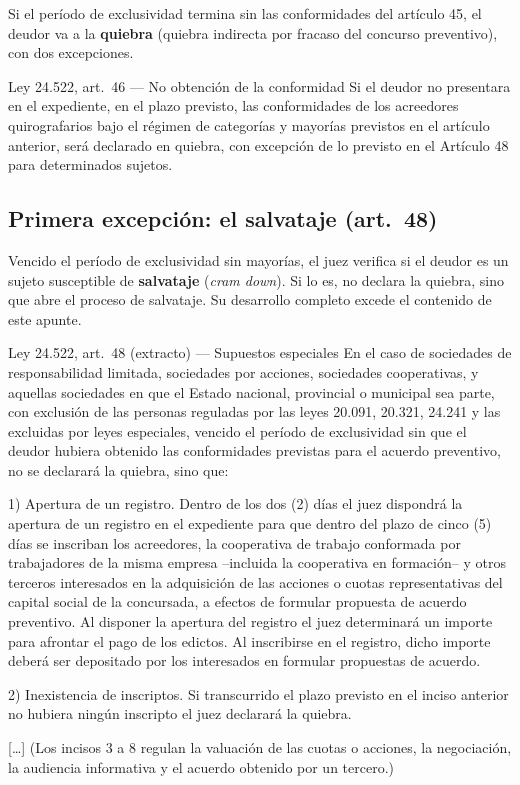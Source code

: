 \documentclass[12pt,oneside]{book}
\begin{document}
Si el período de exclusividad termina sin las conformidades del artículo 45, el deudor va a la \textbf{quiebra} (quiebra indirecta por fracaso del concurso preventivo), con dos excepciones.

\begin{norma}{Ley 24.522, art.\ 46 --- No obtención de la conformidad}
Si el deudor no presentara en el expediente, en el plazo previsto, las conformidades de los acreedores quirografarios bajo el régimen de categorías y mayorías previstos en el artículo anterior, será declarado en quiebra, con excepción de lo previsto en el Artículo 48 para determinados sujetos.
\end{norma}

\subsection{Primera excepción: el salvataje (art.\ 48)}

Vencido el período de exclusividad sin mayorías, el juez verifica si el deudor es un sujeto susceptible de \textbf{salvataje} (\emph{cram down}). Si lo es, no declara la quiebra, sino que abre el proceso de salvataje. Su desarrollo completo excede el contenido de este apunte.

\begin{norma}{Ley 24.522, art.\ 48 (extracto) --- Supuestos especiales}
En el caso de sociedades de responsabilidad limitada, sociedades por acciones, sociedades cooperativas, y aquellas sociedades en que el Estado nacional, provincial o municipal sea parte, con exclusión de las personas reguladas por las leyes 20.091, 20.321, 24.241 y las excluidas por leyes especiales, vencido el período de exclusividad sin que el deudor hubiera obtenido las conformidades previstas para el acuerdo preventivo, no se declarará la quiebra, sino que:

1) Apertura de un registro. Dentro de los dos (2) días el juez dispondrá la apertura de un registro en el expediente para que dentro del plazo de cinco (5) días se inscriban los acreedores, la cooperativa de trabajo conformada por trabajadores de la misma empresa --incluida la cooperativa en formación-- y otros terceros interesados en la adquisición de las acciones o cuotas representativas del capital social de la concursada, a efectos de formular propuesta de acuerdo preventivo. Al disponer la apertura del registro el juez determinará un importe para afrontar el pago de los edictos. Al inscribirse en el registro, dicho importe deberá ser depositado por los interesados en formular propuestas de acuerdo.

2) Inexistencia de inscriptos. Si transcurrido el plazo previsto en el inciso anterior no hubiera ningún inscripto el juez declarará la quiebra.

[\ldots] (Los incisos 3 a 8 regulan la valuación de las cuotas o acciones, la negociación, la audiencia informativa y el acuerdo obtenido por un tercero.)
\end{norma}
\end{document}
